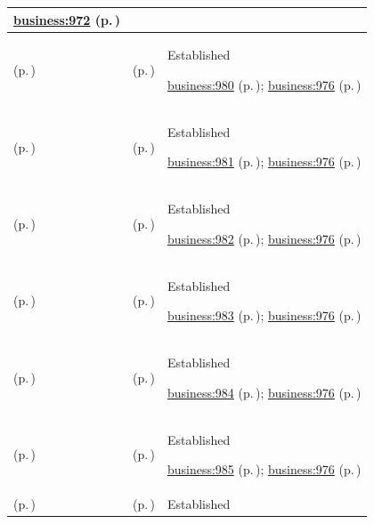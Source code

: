\begin{longtable}{|>{\raggedright\arraybackslash}p{0.27\TableWidth}|>{\raggedright\arraybackslash}p{0.27\TableWidth}|>{\raggedright\arraybackslash}p{0.46\TableWidth}|}
 \hyperref[rad:business:972]{business:972} (p.\,\pageref{rad:business:972})\\\hline
\nameref{cap:bc-corporate-support-services} (p.\,\pageref{cap:bc-corporate-support-services}) & \nameref{cap:bc-back-office-services} (p.\,\pageref{cap:bc-back-office-services}) & Established

 \hyperref[rad:business:978]{business:980} (p.\,\pageref{rad:business:978}); \hyperref[rad:business:976]{business:976} (p.\,\pageref{rad:business:976})\\\hline
\nameref{cap:bc-corporate-support-services} (p.\,\pageref{cap:bc-corporate-support-services}) & \nameref{cap:bc-facilities-management} (p.\,\pageref{cap:bc-facilities-management}) & Established

 \hyperref[rad:business:978]{business:981} (p.\,\pageref{rad:business:978}); \hyperref[rad:business:976]{business:976} (p.\,\pageref{rad:business:976})\\\hline
\nameref{cap:bc-corporate-support-services} (p.\,\pageref{cap:bc-corporate-support-services}) & \nameref{cap:bc-it-infrastructure-management} (p.\,\pageref{cap:bc-it-infrastructure-management}) & Established

 \hyperref[rad:business:978]{business:982} (p.\,\pageref{rad:business:978}); \hyperref[rad:business:976]{business:976} (p.\,\pageref{rad:business:976})\\\hline
\nameref{cap:bc-corporate-support-services} (p.\,\pageref{cap:bc-corporate-support-services}) & \nameref{cap:bc-communications-publicity} (p.\,\pageref{cap:bc-communications-publicity}) & Established

 \hyperref[rad:business:978]{business:983} (p.\,\pageref{rad:business:978}); \hyperref[rad:business:976]{business:976} (p.\,\pageref{rad:business:976})\\\hline
\nameref{cap:bc-corporate-support-services} (p.\,\pageref{cap:bc-corporate-support-services}) & \nameref{cap:bc-people-management} (p.\,\pageref{cap:bc-people-management}) & Established

 \hyperref[rad:business:978]{business:984} (p.\,\pageref{rad:business:978}); \hyperref[rad:business:976]{business:976} (p.\,\pageref{rad:business:976})\\\hline
\nameref{cap:bc-corporate-support-services} (p.\,\pageref{cap:bc-corporate-support-services}) & \nameref{cap:bc-operational-oversight} (p.\,\pageref{cap:bc-operational-oversight}) & Established

 \hyperref[rad:business:978]{business:985} (p.\,\pageref{rad:business:978}); \hyperref[rad:business:976]{business:976} (p.\,\pageref{rad:business:976})\\\hline
\nameref{cap:bc-health-service-governance} (p.\,\pageref{cap:bc-health-service-governance}) & \nameref{cap:bc-governance-framework-management} (p.\,\pageref{cap:bc-governance-framework-management}) & Established


\end{longtable}
